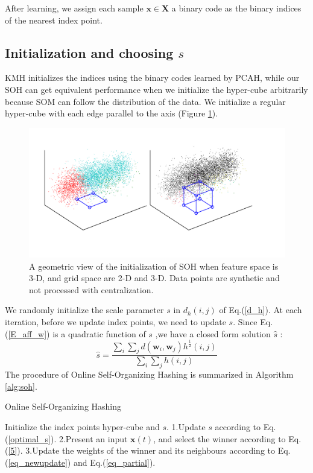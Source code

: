 \documentclass{article}
\begin{document}
After learning, we assign each sample $\mathbf{x} \in \mathbf{X}$ a binary code as the binary indices of the nearest index point.
\subsection{Initialization and choosing $s$}
KMH initializes the indices using the binary codes learned by PCAH, while our SOH can get equivalent performance when we initialize the hyper-cube arbitrarily because  SOM can follow the distribution of  the data. We initialize a regular hyper-cube with each edge parallel to the axis (Figure \ref{init}).
\begin{figure}[ht]
	\begin{center}
		\includegraphics[width=0.76\columnwidth]{init}
		\caption{A geometric view of the initialization of SOH when feature space is 3-D, and grid space are 2-D and 3-D. Data points are synthetic and not processed with centralization.}
		\label{init}
	\end{center}
\end{figure}

We randomly initialize the scale parameter $s$ in $d_{h}(i, j)$ of Eq.(\ref{d_h}). At each iteration, before we update index points, we need to update $s$. Since Eq.(\ref{E_aff_w}) is a quadratic function of $s$ ,we have a closed form solution $\hat{s}$ :
\begin{equation}\label{optimal_s}
\hat{s} = \frac{\sum_{i}\sum_{j}d(\mathbf{w}_{i}, \mathbf{w}_{j})h^{\frac{1}{2}}(i,j)}{\sum_{i}\sum_{j}h(i,j)}
\end{equation}
The procedure of Online Self-Organizing Hashing is summarized in Algorithm \ref{alg:soh}.
\begin{algorithm}[tb]
	\caption{Online Self-Organizing Hashing}
	\label{alg:soh}
	\begin{algorithmic}
		\State Initialize the index points hyper-cube and $s$.
		\State 1.Update $s$ according to Eq.(\ref{optimal_s}).
		\State 2.Present an input $\mathbf{x}(t)$, and select the winner according to Eq.(\ref{5}).
		\State 3.Update the weights of the winner and its neighbours according to Eq.(\ref{eq_newupdate}) and Eq.(\ref{eq_partial}).
		\EndFor
	\end{algorithmic}
\end{algorithm}
\end{document}

